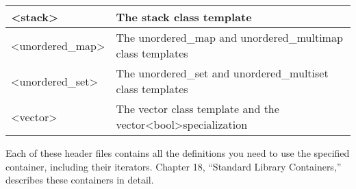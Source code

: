 \begin{longtable}{|l|l|}
\textless{}stack\textgreater{}           & The stack class template                                   \\ \hline
\textless{}unordered\_map\textgreater{}  & The unordered\_map and unordered\_multimap class templates \\ \hline
\textless{}unordered\_set\textgreater{}  & The unordered\_set and unordered\_multiset class templates \\ \hline
\textless{}vector\textgreater{} &
The vector class template and the vector\textless{}bool\textgreater specialization \\ \hline
\end{longtable}

Each of these header files contains all the definitions you need to use the specified container, including their iterators. Chapter 18, “Standard Library Containers,” describes these containers in detail.














